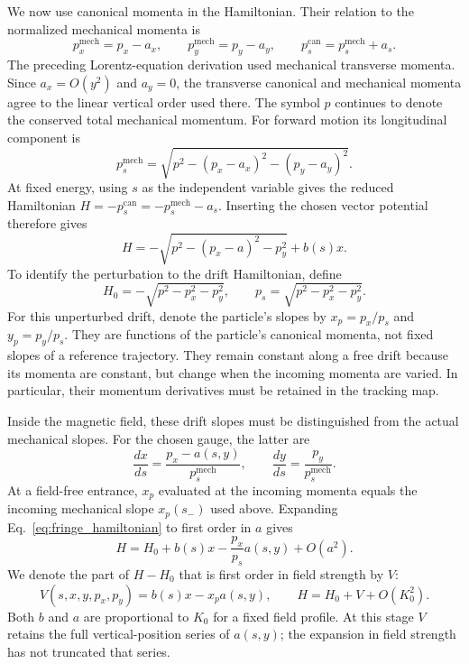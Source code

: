 We now use canonical momenta in the Hamiltonian. Their relation to the
normalized mechanical momenta is
\begin{equation}
 p_x^{\mathrm{mech}}=p_x-a_x,\qquad
 p_y^{\mathrm{mech}}=p_y-a_y,\qquad
 p_s^{\mathrm{can}}=p_s^{\mathrm{mech}}+a_s.
\end{equation}
The preceding Lorentz-equation derivation used mechanical transverse
momenta. Since $a_x=O(y^2)$ and $a_y=0$, the transverse canonical and
mechanical momenta agree to the linear vertical order used there.
The symbol $p$ continues to denote the conserved total mechanical momentum.
For forward motion its longitudinal component is
\begin{equation}
 p_s^{\mathrm{mech}}
 =\sqrt{p^2-(p_x-a_x)^2-(p_y-a_y)^2}.
\end{equation}
At fixed energy, using $s$ as the independent variable gives the reduced
Hamiltonian $H=-p_s^{\mathrm{can}}=-p_s^{\mathrm{mech}}-a_s$.
Inserting the chosen vector potential therefore gives
\begin{equation}
 H=-\sqrt{p^2-(p_x-a)^2-p_y^2}+b(s)x.
 \label{eq:fringe_hamiltonian}
\end{equation}
To identify the perturbation to the drift Hamiltonian, define
\begin{equation}
 H_0=-\sqrt{p^2-p_x^2-p_y^2},\qquad
 p_s=\sqrt{p^2-p_x^2-p_y^2}.
\end{equation}
For this unperturbed drift, denote the particle's slopes by
$x_p=p_x/p_s$ and $y_p=p_y/p_s$. They are functions of the particle's
canonical momenta, not fixed slopes of a reference trajectory. They remain
constant along a free drift because its momenta are constant, but change
when the incoming momenta are varied. In particular, their momentum
derivatives must be retained in the tracking map.

Inside the magnetic field, these drift slopes must be distinguished from
the actual mechanical slopes. For the chosen gauge, the latter are
\begin{equation}
 \frac{dx}{ds}=\frac{p_x-a(s,y)}{p_s^{\mathrm{mech}}},\qquad
 \frac{dy}{ds}=\frac{p_y}{p_s^{\mathrm{mech}}}.
\end{equation}
At a field-free entrance, $x_p$ evaluated at the incoming momenta equals
the incoming mechanical slope $x_p(s_-)$ used above.
Expanding
Eq.~\eqref{eq:fringe_hamiltonian} to first order in $a$ gives
\begin{equation}
 H=H_0+b(s)x-\frac{p_x}{p_s}a(s,y)+O(a^2).
\end{equation}
We denote the part of $H-H_0$ that is first order in field strength by $V$:
\begin{equation}
 V(s,x,y,p_x,p_y)=b(s)x-x_pa(s,y),\qquad
 H=H_0+V+O(K_0^2).
 \label{eq:fringe_physical_perturbation}
\end{equation}
Both $b$ and $a$ are proportional to $K_0$ for a fixed field profile.
At this stage $V$ retains the full vertical-position series of $a(s,y)$;
the expansion in field strength has not truncated that series.

